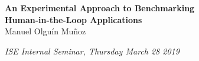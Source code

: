 \documentclass[aspectratio=1610]{beamer}
\newcommand{\kthaffil}{\textsuperscript{\textdagger}}
\newcommand{\cmuaffil}{\textsuperscript{\textdaggerdbl}}
\begin{document}
\startpage
\begin{frame}{}
    \begin{center}
        \textbf{An Experimental Approach to Benchmarking\\Human-in-the-Loop Applications}\\
        \vspace{0.02\textheight}
        {%
            \footnotesize%
            Manuel Olguín Muñoz\\
        }
    \end{center}

    \vspace{0.04\textheight}

    \begin{tiny}
        \raggedleft%
        \emph{ISE Internal Seminar, Thursday March 28 2019}\\
    \end{tiny}
\end{frame}

\normalpage%
\end{document}

